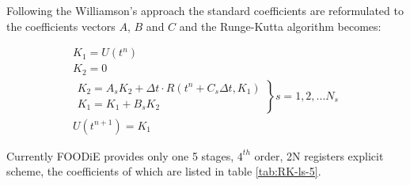 \documentclass[pdftex,preprint,3p,times,numbers]{elsarticle}
\begin{document}
Following the Williamson's approach the standard coefficients are reformulated to the coefficients vectors $A$, $B$ and $C$ and the Runge-Kutta algorithm becomes:

\begin{equation}
\begin{matrix}
  K_1 = U\left(t^n\right) \\
  K_2 = 0 \\
  \left.\begin{matrix}
    K_2 = A_s K_2 + \Delta t \cdot R\left(t^n + C_s \Delta t, K_1\right) \\
    K_1 = K_1 + B_s K_2
  \end{matrix}\right\} s=1,2,...N_s\\
  U\left(t^{n+1}\right) = K_1
  \end{matrix}
\label{eq:RK-ls}
\end{equation}

Currently FOODiE provides only one 5 stages, $4^{th}$ order, 2N registers explicit scheme, the coefficients of which are listed in table \ref{tab:RK-ls-5}.

\begin{table}[!ht]
  \centering
  \caption{Williamson's table of 5 stages, $4^{th}$ order, Runge-Kutta low storage scheme\label{tab:RK-ls-5}}
\end{table}
\end{document}
